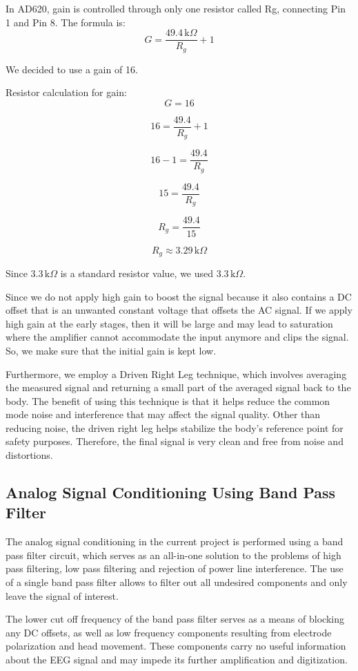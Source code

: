 In AD620, gain is controlled through only one resistor called Rg, connecting Pin 1 and Pin 8.
The formula is:
\[
G = \frac{49.4\,\text{k}\Omega}{R_g} + 1
\]

We decided to use a gain of 16.

Resistor calculation for gain:
\[
G = 16
\]

\[
16 = \frac{49.4}{R_g} + 1
\]

\[
16 - 1 = \frac{49.4}{R_g}
\]

\[
15 = \frac{49.4}{R_g}
\]

\[
R_g = \frac{49.4}{15}
\]

\[
R_g \approx 3.29\,\text{k}\Omega
\]

Since \(3.3\,\text{k}\Omega\) is a standard resistor value, we used \(3.3\,\text{k}\Omega\).

Since we do not apply high gain to boost the signal because it also contains a DC offset that is an unwanted constant voltage that offsets the AC signal. If we apply high gain at the early stages, then it will be large and may lead to saturation where the amplifier cannot accommodate the input anymore and clips the signal. So, we make sure that the initial gain is kept low.

Furthermore, we employ a Driven Right Leg technique, which involves averaging the measured signal and returning a small part of the averaged signal back to the body. The benefit of using this technique is that it helps reduce the common mode noise and interference that may affect the signal quality. Other than reducing noise, the driven right leg helps stabilize the body's reference point for safety purposes. Therefore, the final signal is very clean and free from noise and distortions.

\subsection{Analog Signal Conditioning Using Band Pass Filter}
The analog signal conditioning in the current project is performed using a band pass filter circuit, which serves as an all-in-one solution to the problems of high pass filtering, low pass filtering and rejection of power line interference. The use of a single band pass filter allows to filter out all undesired components and only leave the signal of interest.

The lower cut off frequency of the band pass filter serves as a means of blocking any DC offsets, as well as low frequency components resulting from electrode polarization and head movement. These components carry no useful information about the EEG signal and may impede its further amplification and digitization.

